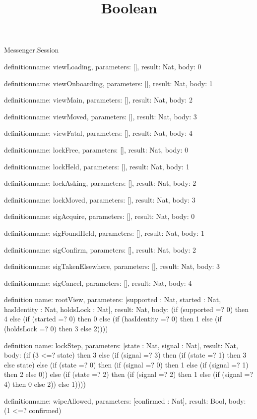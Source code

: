 \begin{lexlean}{Messenger.Session}
\title{Boolean}
\begin{semanticmodule}
definition{name: viewLoading, parameters: [], result: Nat, body: 0}

definition{name: viewOnboarding, parameters: [], result: Nat, body: 1}

definition{name: viewMain, parameters: [], result: Nat, body: 2}

definition{name: viewMoved, parameters: [], result: Nat, body: 3}

definition{name: viewFatal, parameters: [], result: Nat, body: 4}

definition{name: lockFree, parameters: [], result: Nat, body: 0}

definition{name: lockHeld, parameters: [], result: Nat, body: 1}

definition{name: lockAsking, parameters: [], result: Nat, body: 2}

definition{name: lockMoved, parameters: [], result: Nat, body: 3}

definition{name: sigAcquire, parameters: [], result: Nat, body: 0}

definition{name: sigFoundHeld, parameters: [], result: Nat, body: 1}

definition{name: sigConfirm, parameters: [], result: Nat, body: 2}

definition{name: sigTakenElsewhere, parameters: [], result: Nat, body: 3}

definition{name: sigCancel, parameters: [], result: Nat, body: 4}

definition{
  name: rootView,
  parameters: [supported : Nat, started : Nat, hasIdentity : Nat, holdsLock : Nat],
  result: Nat,
  body: (if (supported =? 0) then 4 else (if (started =? 0) then 0 else (if (hasIdentity =? 0) then 1 else (if (holdsLock =? 0) then 3 else 2))))
}

definition{
  name: lockStep,
  parameters: [state : Nat, signal : Nat],
  result: Nat,
  body: (if (3 <=? state) then 3 else (if (signal =? 3) then (if (state =? 1) then 3 else state) else (if (state =? 0) then (if (signal =? 0) then 1 else (if (signal =? 1) then 2 else 0)) else (if (state =? 2) then (if (signal =? 2) then 1 else (if (signal =? 4) then 0 else 2)) else 1))))
}

definition{name: wipeAllowed, parameters: [confirmed : Nat], result: Bool, body: (1 <=? confirmed)}


\end{semanticmodule}
\end{lexlean}
